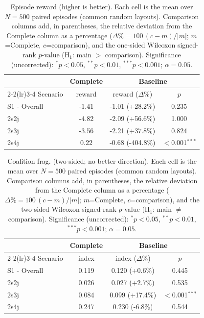 \begin{table}[ht]
  \centering
  \caption{Episode reward (higher is better). Each cell is the mean over $N=500$ paired episodes (common random layouts). Comparison columns add, in parentheses, the relative deviation from the Complete column as a percentage ($\Delta\%=100\,(c-m)/|m|$; $m$=Complete, $c$=comparison), and the one-sided Wilcoxon signed-rank $p$-value (H$_1$: main $>$ comparison). Significance (uncorrected): $^{*}p<0.05$, $^{**}p<0.01$, $^{***}p<0.001$; $\alpha=0.05$.}
  \label{tab:wilcoxon-reward}
  \small
  \begin{tabular}{l c cc}
    \toprule
     & Complete & \multicolumn{2}{c}{Baseline} \\
    \cmidrule(lr){2-2}\cmidrule(lr){3-4}
    Scenario & {reward} & {reward ($\Delta$\%)} & {$p$} \\
    \midrule
    S1 - Overall & -1.41 & -1.01 (+28.2\%) & 0.235 \\
    2s2j & -4.82 & -2.09 (+56.6\%) & 1.000 \\
    2s3j & -3.56 & -2.21 (+37.8\%) & 0.824 \\
    2s4j & 0.22 & -0.68 (-404.8\%) & $<$0.001$^{***}$ \\
    \bottomrule
  \end{tabular}
\end{table}

\begin{table}[ht]
  \centering
  \caption{Coalition frag. (two-sided; no better direction). Each cell is the mean over $N=500$ paired episodes (common random layouts). Comparison columns add, in parentheses, the relative deviation from the Complete column as a percentage ($\Delta\%=100\,(c-m)/|m|$; $m$=Complete, $c$=comparison), and the two-sided Wilcoxon signed-rank $p$-value (H$_1$: main $\neq$ comparison). Significance (uncorrected): $^{*}p<0.05$, $^{**}p<0.01$, $^{***}p<0.001$; $\alpha=0.05$.}
  \label{tab:wilcoxon-fragmentation}
  \small
  \begin{tabular}{l c cc}
    \toprule
     & Complete & \multicolumn{2}{c}{Baseline} \\
    \cmidrule(lr){2-2}\cmidrule(lr){3-4}
    Scenario & {index} & {index ($\Delta$\%)} & {$p$} \\
    \midrule
    S1 - Overall & 0.119 & 0.120 (+0.6\%) & 0.445 \\
    2s2j & 0.026 & 0.027 (+2.7\%) & 0.535 \\
    2s3j & 0.084 & 0.099 (+17.4\%) & $<$0.001$^{***}$ \\
    2s4j & 0.247 & 0.230 (-6.8\%) & 0.544 \\
    \bottomrule
  \end{tabular}
\end{table}
